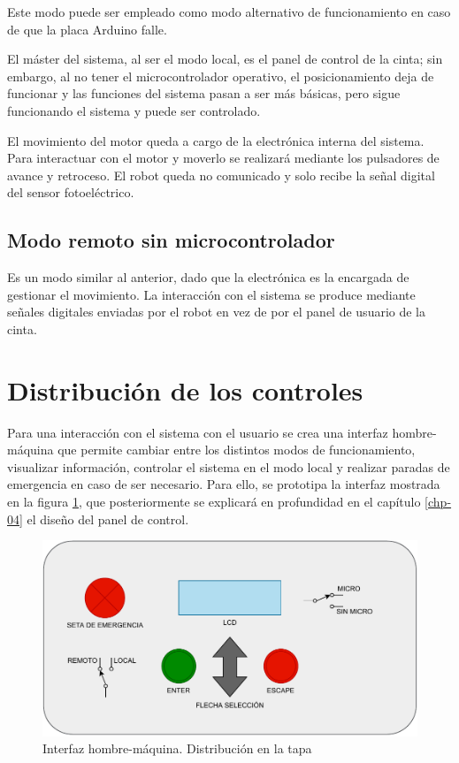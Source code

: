 Este modo puede ser empleado como modo alternativo de funcionamiento en caso de que la placa Arduino falle.

El máster del sistema, al ser el modo local, es el panel de control de la cinta; sin embargo, al no tener el microcontrolador operativo, el posicionamiento deja de funcionar y las funciones del sistema pasan a ser más básicas, pero sigue funcionando el sistema y puede ser controlado.

El movimiento del motor queda a cargo de la electrónica interna del sistema. Para interactuar con el motor y moverlo se realizará mediante los pulsadores de avance y retroceso. El robot queda no comunicado y solo recibe la señal digital del sensor fotoeléctrico.


\subsection{Modo remoto sin microcontrolador}\label{subsec-04}

Es un modo similar al anterior, dado que la electrónica es la encargada de gestionar el movimiento. La interacción con el sistema se produce mediante señales digitales enviadas por el robot en vez de por el panel de usuario de la cinta.

\section{Distribución de los controles}

Para una interacción con el sistema con el usuario se crea una interfaz hombre-máquina que permite cambiar entre los distintos modos de funcionamiento, visualizar información, controlar el sistema en el modo local y realizar paradas de emergencia en caso de ser necesario. Para ello, se prototipa la interfaz mostrada en la figura 
\ref{fig:interfazhmi}, que posteriormente se explicará en profundidad en el capítulo \ref{chp-04} el diseño del panel de control.

\begin{figure}[htbp]
	\centering
	\includegraphics[width=\textwidth]{01-introduccion/HMI.pdf}
	\caption{Interfaz hombre-máquina. Distribución en la tapa}
	\label{fig:interfazhmi}
	\end{figure}

